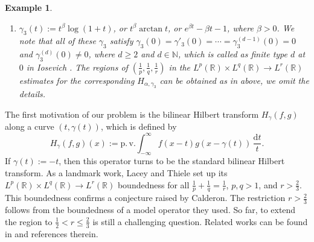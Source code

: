 \documentclass[11pt, twoside, leqno]{article}
\newtheorem{example}[theorem]{Example}
\theoremstyle{definition}
\numberwithin{equation}{section}
\begin{document}
\begin{example}
\begin{enumerate}
\begin{align*}
&\begin{cases}
 E\left(1, 1-\frac{\alpha}{\alpha_k}, 2(1-\frac{\alpha}{\alpha_k})\right),~~~~~~~~~F\left(1-\frac{\alpha}{\alpha_k}, 1, 2(1-\frac{\alpha}{\alpha_k})\right),& if~ \frac{\alpha}{1-\alpha}<\alpha_k;\\
 G_1\left(1, \frac{1-\alpha}{2-\alpha_k}, \frac{2(1-\alpha)}{2-\alpha_k}\right),~~~~~~~~~~~~~~~H\left(1-\frac{\alpha}{\alpha_k}, 1, 2(1-\frac{\alpha}{\alpha_k})\right),&  if~ \frac{\alpha}{1-\alpha} \geq \alpha_k~and~\alpha_k \leq 2\alpha;\\
G^1_2\left(1, \frac{\alpha}{\alpha_k}, 1\right),~~G^2_2\left(1, \frac{1}{2}, 1\right),~~~ H\left(1-\frac{\alpha}{\alpha_k}, 1, 2(1-\frac{\alpha}{\alpha_k})\right),& if~ \frac{\alpha}{1-\alpha} \geq \alpha_k ~and~2\alpha<\alpha_k.
\end{cases}
\end{align*}
\item[\rm(3)] $\gamma_3(t):=t^\beta\log(1+t)$, or $t^\beta \arctan t$, or $e^{\beta t}-\beta t-1$, where $\beta>0$. We note that all of these $\gamma_3$  satisfy $\gamma_3(0)=\gamma'_3(0)=\cdots=\gamma^{(d-1)}_3(0)=0$ and $\gamma^{(d)}_3(0)\neq0$, where $d\geq 2$ and $d\in\mathbb{N}$, which is called as finite type $d$ at $0$ in Iosevich \cite{Iose}. The regions of $(\frac{1}{p}, \frac{1}{q}, \frac{1}{r})$ in the $L^p(\mathbb{R})\times L^q(\mathbb{R}) \rightarrow L^r(\mathbb{R})$ estimates for the corresponding $H_{\alpha,\gamma_3}$ can be obtained as in above, we omit the details.
\end{enumerate}
\end{example}

The first motivation of our problem is the bilinear Hilbert transform $H_{\gamma}(f,g)$ along a curve $(t,\gamma(t))$, which is defined by
$$H_{\gamma}(f,g)(x):=\mathrm{p.\,v.}\int_{-\infty}^{\infty}f(x-t)g(x-\gamma(t))\,\frac{\textrm{d}t}{t}.$$
If $\gamma(t):=-t$, then this operator turns to be the standard bilinear Hilbert transform. As a landmark work, Lacey and Thiele \cite{LT1,LT2} set up its $L^p(\mathbb{R})\times L^q(\mathbb{R})\rightarrow L^r(\mathbb{R})$ boundedness for all $\frac{1}{p}+\frac{1}{q}=\frac{1}{r}$, $p, q>1$, and $r>\frac{2}{3}$. This boundedness confirms a conjecture raised by Calderon. The restriction $r>\frac{2}{3}$ follows from the boundedness of a model operator they used. So far, to extend the region to $\frac{1}{2} < r \leq \frac{2}{3}$ is still a challenging question. Related works can be found in \cite{GLi04,LiXC,LiLi22} and references therein.
\end{document}
